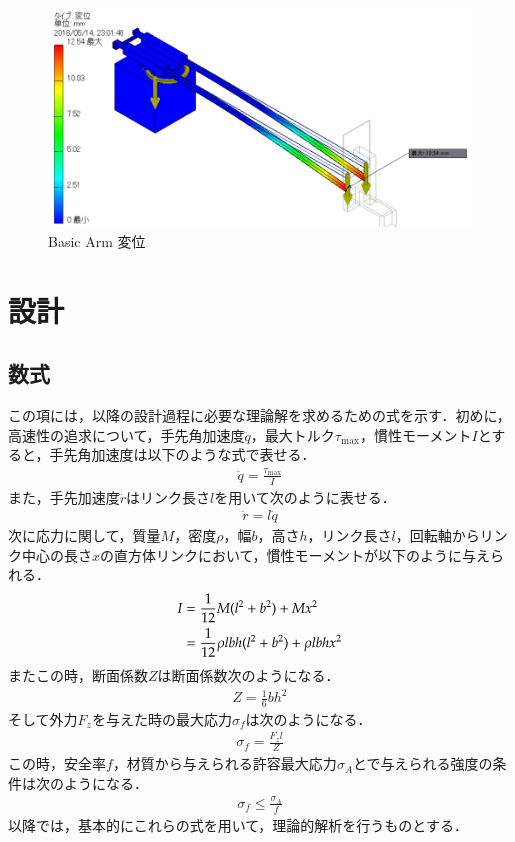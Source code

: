 \documentclass[10pt,b5paper,papersize,dvipdfmx]{jsbook}
\begin{document}
\begin{figure}[htbp]
  \centering
  \includegraphics[width=12cm]{img/robot12.png}
  \caption{Basic Arm 変位}
  \label{fig:Basic Arm 変位}
\end{figure}
\clearpage
\section{設計}
\subsection{数式}\label{数式}
この項には，以降の設計過程に必要な理論解を求めるための式を示す．初めに，高速性の追求について，手先角加速度$\ddot{q}$，最大トルク$\tau_{\mathrm{max}}$，慣性モーメント$I$とすると，手先角加速度は以下のような式で表せる．
\begin{align}
\ddot{q}=\frac{\tau_{\mathrm{max}}}{I}
\end{align}
また，手先加速度$\ddot{r}$はリンク長さ$l$を用いて次のように表せる．
\begin{align}
\ddot{r}=l\ddot{q}
\end{align}
次に応力に関して，質量$M$，密度$\rho$，幅$b$，高さ$h$，リンク長さ$l$，回転軸からリンク中心の長さ$x$の直方体リンクにおいて，慣性モーメントが以下のように与えられる．
\begin{align}
  I &= \frac{1}{12}M(l^2+b^2)+Mx^2 \notag\\
    &= \frac{1}{12} \rho lbh(l^2+b^2 )+\rho lbhx^2
\end{align}
またこの時，断面係数$Z$は断面係数次のようになる．
\begin{align}
  Z=\frac{1}{6}bh^2
\end{align}
そして外力$F_z$を与えた時の最大応力$\sigma_f$は次のようになる．
\begin{align}
  \sigma_f=\frac{F_zl}{Z}
\end{align}
この時，安全率$f$，材質から与えられる許容最大応力$\sigma_A$とで与えられる強度の条件は次のようになる．
\begin{align}
  \sigma_f\leq\frac{\sigma_A}{f}
\end{align}
以降では，基本的にこれらの式を用いて，理論的解析を行うものとする．
\end{document}
